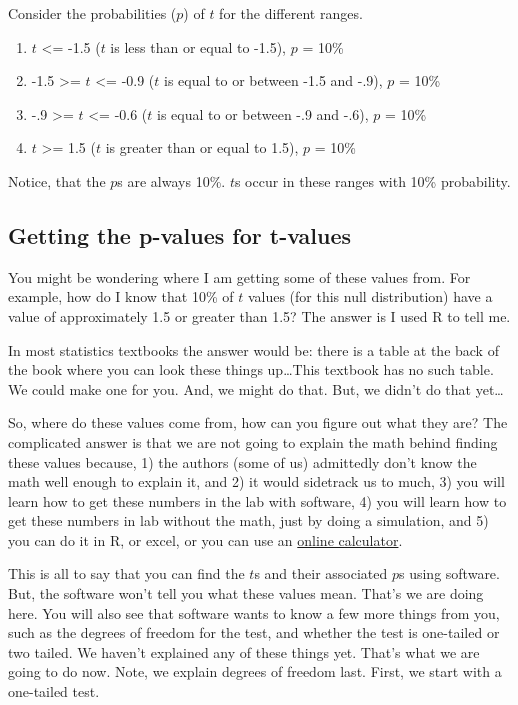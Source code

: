 \documentclass[]{book}
\providecommand{\tightlist}{%
  \setlength{\itemsep}{0pt}\setlength{\parskip}{0pt}}
\begin{document}
Consider the probabilities (\(p\)) of \(t\) for the different ranges.

\begin{enumerate}
\def\labelenumi{\arabic{enumi}.}
\tightlist
\item
  \(t\) \textless{}= -1.5 (\(t\) is less than or equal to -1.5), \(p\) = 10\%
\item
  -1.5 \textgreater{}= \(t\) \textless{}= -0.9 (\(t\) is equal to or between -1.5 and -.9), \(p\) = 10\%
\item
  -.9 \textgreater{}= \(t\) \textless{}= -0.6 (\(t\) is equal to or between -.9 and -.6), \(p\) = 10\%
\item
  \(t\) \textgreater{}= 1.5 (\(t\) is greater than or equal to 1.5), \(p\) = 10\%
\end{enumerate}

Notice, that the \(p\)s are always 10\%. \(t\)s occur in these ranges with 10\% probability.

\hypertarget{getting-the-p-values-for-t-values}{%
\subsection{Getting the p-values for t-values}\label{getting-the-p-values-for-t-values}}

You might be wondering where I am getting some of these values from. For example, how do I know that 10\% of \(t\) values (for this null distribution) have a value of approximately 1.5 or greater than 1.5? The answer is I used R to tell me.

In most statistics textbooks the answer would be: there is a table at the back of the book where you can look these things up\ldots{}This textbook has no such table. We could make one for you. And, we might do that. But, we didn't do that yet\ldots{}

So, where do these values come from, how can you figure out what they are? The complicated answer is that we are not going to explain the math behind finding these values because, 1) the authors (some of us) admittedly don't know the math well enough to explain it, and 2) it would sidetrack us to much, 3) you will learn how to get these numbers in the lab with software, 4) you will learn how to get these numbers in lab without the math, just by doing a simulation, and 5) you can do it in R, or excel, or you can use an \href{http://www.socscistatistics.com/pvalues/tdistribution.aspx}{online calculator}.

This is all to say that you can find the \(t\)s and their associated \(p\)s using software. But, the software won't tell you what these values mean. That's we are doing here. You will also see that software wants to know a few more things from you, such as the degrees of freedom for the test, and whether the test is one-tailed or two tailed. We haven't explained any of these things yet. That's what we are going to do now. Note, we explain degrees of freedom last. First, we start with a one-tailed test.
\end{document}
